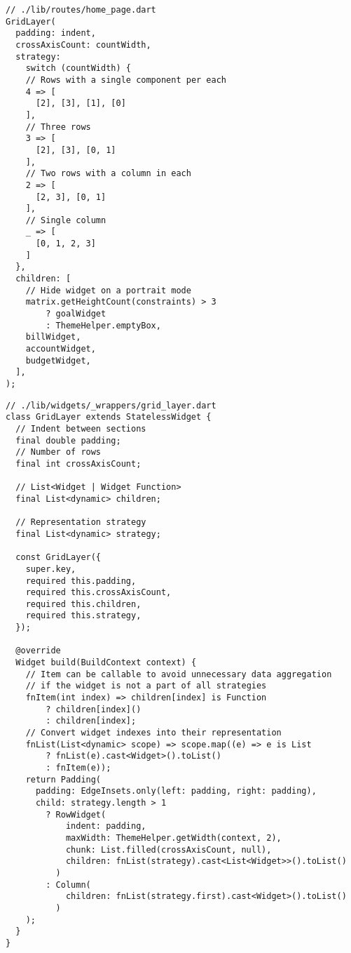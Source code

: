 \begin{lstlisting}
// ./lib/routes/home_page.dart
GridLayer(
  padding: indent,
  crossAxisCount: countWidth,
  strategy:
    switch (countWidth) {
    // Rows with a single component per each
    4 => [
      [2], [3], [1], [0]
    ],
    // Three rows
    3 => [
      [2], [3], [0, 1]
    ],
    // Two rows with a column in each
    2 => [
      [2, 3], [0, 1]
    ],
    // Single column
    _ => [
      [0, 1, 2, 3]
    ]
  },
  children: [
    // Hide widget on a portrait mode
    matrix.getHeightCount(constraints) > 3
        ? goalWidget
        : ThemeHelper.emptyBox,
    billWidget,
    accountWidget,
    budgetWidget,
  ],
);
\end{lstlisting}
\begin{lstlisting}
// ./lib/widgets/_wrappers/grid_layer.dart
class GridLayer extends StatelessWidget {
  // Indent between sections
  final double padding;
  // Number of rows
  final int crossAxisCount;

  // List<Widget | Widget Function>
  final List<dynamic> children;

  // Representation strategy
  final List<dynamic> strategy;

  const GridLayer({
    super.key,
    required this.padding,
    required this.crossAxisCount,
    required this.children,
    required this.strategy,
  });

  @override
  Widget build(BuildContext context) {
    // Item can be callable to avoid unnecessary data aggregation
    // if the widget is not a part of all strategies
    fnItem(int index) => children[index] is Function 
        ? children[index]() 
        : children[index];
    // Convert widget indexes into their representation
    fnList(List<dynamic> scope) => scope.map((e) => e is List 
        ? fnList(e).cast<Widget>().toList() 
        : fnItem(e));
    return Padding(
      padding: EdgeInsets.only(left: padding, right: padding),
      child: strategy.length > 1
        ? RowWidget(
            indent: padding,
            maxWidth: ThemeHelper.getWidth(context, 2),
            chunk: List.filled(crossAxisCount, null),
            children: fnList(strategy).cast<List<Widget>>().toList()
          )
        : Column(
            children: fnList(strategy.first).cast<Widget>().toList()
          )
    );
  }
}
\end{lstlisting}
